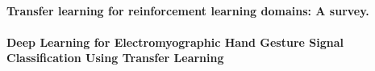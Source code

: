 \documentclass[11pt]{article}
\begin{document}
\paragraph{Transfer learning for reinforcement learning domains: A survey.} \citep{taylor_transfer_2009}

\paragraph{Deep Learning for Electromyographic Hand Gesture Signal Classification Using Transfer Learning} \citep{cote-allard_deep_2019}



\newpage


\end{document}
